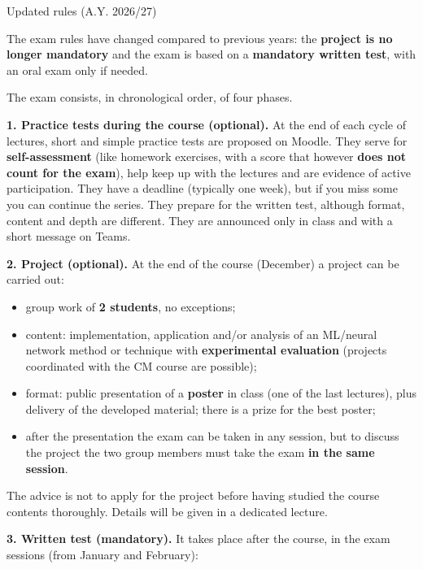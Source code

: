 \begin{boxwarning}{Updated rules (A.Y. 2026/27)}

The exam rules have changed compared to previous years: the
\textbf{project is no longer mandatory} and the exam is based on a
\textbf{mandatory written test}, with an oral exam only if needed.

\end{boxwarning}

The exam consists, in chronological order, of four phases.

\textbf{1. Practice tests during the course (optional).} At the end of
each cycle of lectures, short and simple practice tests are proposed on
Moodle. They serve for \textbf{self-assessment} (like homework
exercises, with a score that however \textbf{does not count for the
exam}), help keep up with the lectures and are evidence of active
participation. They have a deadline (typically one week), but if you
miss some you can continue the series. They prepare for the written
test, although format, content and depth are different. They are
announced only in class and with a short message on Teams.

\textbf{2. Project (optional).} At the end of the course (December) a
project can be carried out:

\begin{itemize}
\tightlist
\item
  group work of \textbf{2 students}, no exceptions;
\item
  content: implementation, application and/or analysis of an ML/neural
  network method or technique with \textbf{experimental evaluation}
  (projects coordinated with the CM course are possible);
\item
  format: public presentation of a \textbf{poster} in class (one of the
  last lectures), plus delivery of the developed material; there is a
  prize for the best poster;
\item
  after the presentation the exam can be taken in any session, but to
  discuss the project the two group members must take the exam
  \textbf{in the same session}.
\end{itemize}

The advice is not to apply for the project before having studied the
course contents thoroughly. Details will be given in a dedicated
lecture.

\textbf{3. Written test (mandatory).} It takes place after the course,
in the exam sessions (from January and February):

